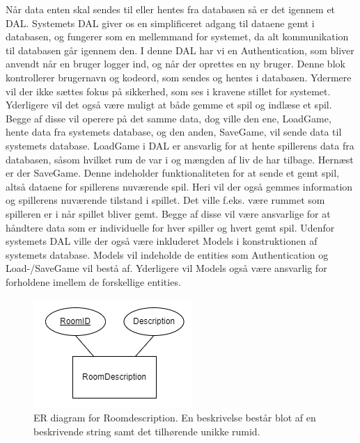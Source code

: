Når data enten skal sendes til eller hentes fra databasen så er det igennem et DAL. Systemets DAL giver os en simplificeret adgang til dataene gemt i databasen, og fungerer som en mellemmand for systemet, da alt kommunikation til databasen går igennem den.
I denne DAL har vi en Authentication, som bliver anvendt når en bruger logger ind, og når der oprettes en ny bruger. Denne blok kontrollerer brugernavn og kodeord, som sendes og hentes i databasen. Ydermere vil der ikke sættes fokus på sikkerhed, som ses i kravene stillet for systemet.
Yderligere vil det også være muligt at både gemme et spil og indlæse et spil. Begge af disse vil operere på det samme data, dog ville den ene, LoadGame, hente data fra systemets database, og den anden, SaveGame, vil sende data til systemets database. 
LoadGame i DAL er ansvarlig for at hente spillerens data fra databasen, såsom hvilket rum de var i og mængden af liv de har tilbage. 
Hernæst er der SaveGame. Denne indeholder funktionaliteten for at sende et gemt spil, altså dataene for spillerens nuværende spil. Heri vil der også gemmes information og spillerens nuværende tilstand i spillet. Det ville f.eks. være rummet som spilleren er i når spillet bliver gemt.
Begge af disse vil være ansvarlige for at håndtere data som er individuelle for hver spiller og hvert gemt spil.
Udenfor systemets DAL ville der også være inkluderet Models i konstruktionen af systemets database. Models vil indeholde de entities som Authentication og Load-/SaveGame vil bestå af. Yderligere vil Models også være ansvarlig for forholdene imellem de forskellige entities. 



\begin{figure}[H]
\centering
\includegraphics[width = \textwidth]{02-Body/Images/ER-RoomDescription.PNG}
\caption{ER diagram for Roomdescription. En beskrivelse består blot af en beskrivende string samt det tilhørende unikke rumid.}
\label{fig:ER-Roomdescription}
\end{figure}

